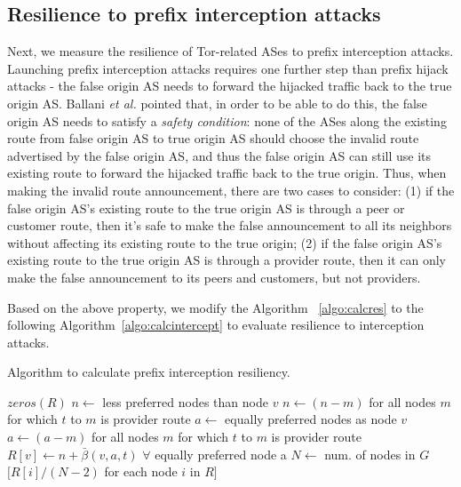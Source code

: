 \subsection{Resilience to prefix interception attacks}
Next, we measure the resilience of Tor-related ASes to prefix interception attacks. Launching prefix interception attacks requires one further step than prefix hijack attacks - the false origin AS needs to forward the hijacked traffic back to the true origin AS. Ballani \emph{et al.} \cite{ballani2007study} pointed that, in order to be able to do this, the false origin AS needs to satisfy a \emph{safety condition}: none of the ASes along the existing route from false origin AS to true origin AS should choose the invalid route advertised by the false origin AS, and thus the false origin AS can still use its existing route to forward the hijacked traffic back to the true origin. Thus, when making the invalid route announcement, there are two cases to consider: (1) if the false origin AS's existing route to the true origin AS is through a peer or customer route, then it's safe to make the false announcement to all its neighbors without affecting its existing route to the true origin; (2) if the false origin AS's existing route to the true origin AS is through a provider route, then it can only make the false announcement to its peers and customers, but not providers. 

Based on the above property, we modify the Algorithm ~\ref{algo:calcres} to the following Algorithm~\ref{algo:calcintercept} to evaluate resilience to interception attacks. 

\begin{algorithm}
\caption{Algorithm to calculate prefix interception resiliency.}
\label{algo:calcintercept}
\begin{algorithmic}
    \State {}
    \State $zeros(R)$
		\State $n \gets$ less preferred nodes than node $v$
			\State $n \gets (n - m)$ for all nodes $m$ for which $t$ to $m$ is provider route
		\EndIf
		\State $a \gets$ equally preferred nodes as node $v$
			\State $a \gets (a - m)$ for all nodes $m$ for which $t$ to $m$ is provider route
		\EndIf
		\State $R[v] \gets n + \bar{\beta}(v,a,t)$ $\forall$ equally preferred node a
	\EndIf
    \EndFor
    \State $N \gets$ num. of nodes in $G$
    \State \Return $[R[i] / (N-2)$ for each node $i$ in $R]$
\EndFunction
\end{algorithmic}
\end{algorithm}

